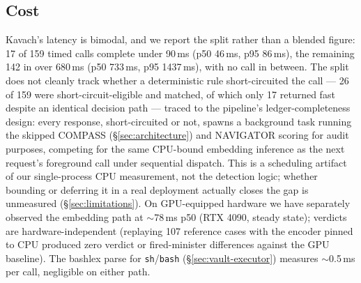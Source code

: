 \subsection{Cost}
\label{sec:cost}
Kavach's latency is bimodal, and we report the split rather than a blended
figure: 17 of 159 timed calls complete under 90\,ms (p50 46\,ms, p95
86\,ms), the remaining 142 in over 680\,ms (p50 733\,ms, p95 1437\,ms), with
no call in between. The split does not cleanly track whether a
deterministic rule short-circuited the call --- 26 of 159 were
short-circuit-eligible and matched, of which only 17 returned fast despite
an identical decision path --- traced to the pipeline's ledger-completeness
design: every response, short-circuited or not, spawns a background task
running the skipped COMPASS (\S\ref{sec:architecture}) and NAVIGATOR
scoring for audit purposes, competing for the same CPU-bound embedding
inference as the next request's foreground call under sequential dispatch.
This is a scheduling artifact of our single-process CPU measurement, not
the detection logic; whether bounding or deferring it in a real deployment
actually closes the gap is unmeasured (\S\ref{sec:limitations}). On
GPU-equipped hardware we have separately observed the
embedding path at $\sim$78\,ms p50 (RTX 4090, steady state); verdicts are
hardware-independent (replaying 107 reference cases with the encoder
pinned to CPU produced zero verdict or fired-minister differences against
the GPU baseline). The bashlex parse for \texttt{sh}/\texttt{bash}
(\S\ref{sec:vault-executor}) measures $\sim$0.5\,ms per call, negligible on
either path.
